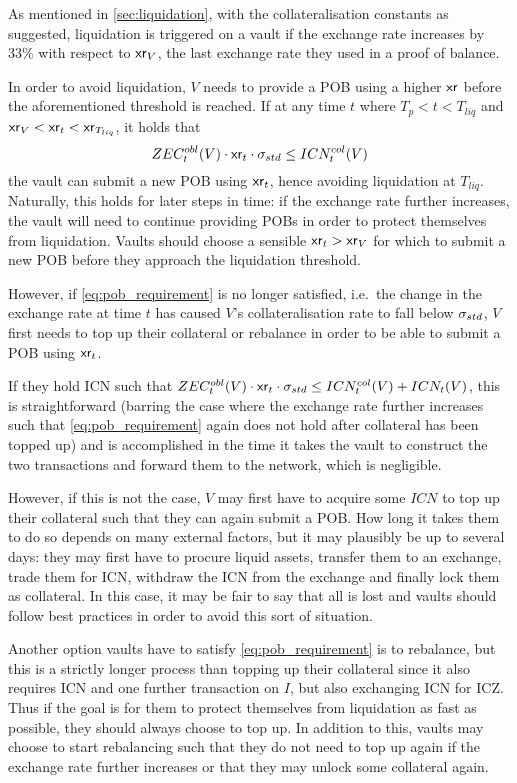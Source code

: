 As mentioned in \cref{sec:liquidation}, with the collateralisation constants as suggested, liquidation is triggered on a vault if the exchange rate increases by 33\% with respect to $\mathsf{xr}_{V}$, the last exchange rate they used in a proof of balance.

In order to avoid liquidation, $V$ needs to provide a POB using a higher $\mathsf{xr}$ before the aforementioned threshold is reached.
If at any time $t$ where $T_{p} < t < T_{liq}$ and $\mathsf{xr}_{V} < \mathsf{xr}_t < \mathsf{xr}_{T_{liq}}$, it holds that
\begin{equation}\label{eq:pob_requirement}
    ZEC^{obl}_t(V) \cdot \mathsf{xr}_t \cdot \sigma_{std} \leq ICN^{col}_t(V)
\end{equation}
the vault can submit a new POB using $\mathsf{xr}_t$, hence avoiding liquidation at $T_{liq}$.
Naturally, this holds for later steps in time: if the exchange rate further increases, the vault will need to continue providing POBs in order to protect themselves from liquidation.
Vaults should choose a sensible $\mathsf{xr}_t > \mathsf{xr}_{V}$ for which to submit a new POB before they approach the liquidation threshold.

However, if \cref{eq:pob_requirement} is no longer satisfied, i.e.\ the change in the exchange rate at time $t$ has caused $V$'s collateralisation rate to fall below $\sigma_{std}$, $V$ first needs to top up their collateral or rebalance in order to be able to submit a POB using $\mathsf{xr}_t$.

If they hold ICN such that $ZEC^{obl}_t(V) \cdot \mathsf{xr}_t \cdot \sigma_{std} \leq ICN^{col}_t(V) + ICN_t(V)$, this is straightforward (barring the case where the exchange rate further increases such that \cref{eq:pob_requirement} again does not hold after collateral has been topped up) and is accomplished in the time it takes the vault to construct the two transactions and forward them to the network, which is negligible.

However, if this is not the case, $V$ may first have to acquire some $ICN$ to top up their collateral such that they can again submit a POB.
How long it takes them to do so depends on many external factors, but it may plausibly be up to several days: they may first have to procure liquid assets, transfer them to an exchange, trade them for ICN, withdraw the ICN from the exchange and finally lock them as collateral.
In this case, it may be fair to say that all is lost and vaults should follow best practices in order to avoid this sort of situation.

Another option vaults have to satisfy \cref{eq:pob_requirement} is to rebalance, but this is a strictly longer process than topping up their collateral since it also requires ICN and one further transaction on $I$, but also exchanging ICN for ICZ.
Thus if the goal is for them to protect themselves from liquidation as fast as possible, they should always choose to top up.
In addition to this, vaults may choose to start rebalancing such that they do not need to top up again if the exchange rate further increases or that they may unlock some collateral again.

